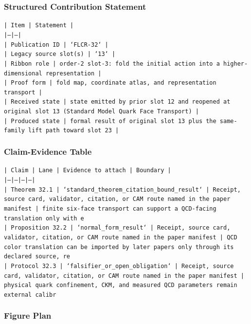 \documentclass[11pt]{article}
\begin{document}
\subsubsection*{Structured Contribution Statement}

\noindent\texttt{| Item | Statement |}\\
\noindent\texttt{|---|---|}\\
\noindent\texttt{| Publication ID | `FLCR-32` |}\\
\noindent\texttt{| Legacy source slot(s) | `13` |}\\
\noindent\texttt{| Ribbon role | order-2 slot-3: fold the initial action into a higher-dimensional representation |}\\
\noindent\texttt{| Proof form | fold map, coordinate atlas, and representation transport |}\\
\noindent\texttt{| Received state | state emitted by prior slot 12 and reopened at original slot 13 (Standard Model Quark Face Transport) |}\\
\noindent\texttt{| Produced state | formal result of original slot 13 plus the same-family lift path toward slot 23 |}\\

\subsubsection*{Claim-Evidence Table}

\noindent\texttt{| Claim | Lane | Evidence to attach | Boundary |}\\
\noindent\texttt{|---|---|---|---|}\\
\noindent\texttt{| Theorem 32.1 | `standard\_theorem\_citation\_bound\_result` | Receipt, source card, validator, citation, or CAM route named in the paper manifest | finite six-face transport can support a QCD-facing translation only with e}\\
\noindent\texttt{| Proposition 32.2 | `normal\_form\_result` | Receipt, source card, validator, citation, or CAM route named in the paper manifest | QCD color translation can be imported by later papers only through its declared source, re}\\
\noindent\texttt{| Protocol 32.3 | `falsifier\_or\_open\_obligation` | Receipt, source card, validator, citation, or CAM route named in the paper manifest | physical quark confinement, CKM, and measured QCD parameters remain external calibr}\\

\subsubsection*{Figure Plan}
\end{document}
